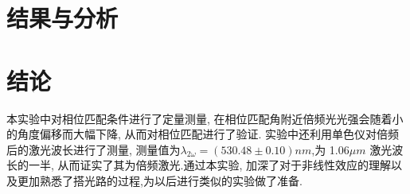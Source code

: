 \documentclass[aps,pre,12pt,preprint,%
	onecolumn,showpacs,showkeys,nofootinbib]{revtex4-2}
\begin{document}
\section{结果与分析}
%	
%	

\section{结论}
本实验中对相位匹配条件进行了定量测量, 在相位匹配角附近倍频光光强会随着小的角度偏移而大幅下降, 从而对相位匹配进行了验证. 实验中还利用单色仪对倍频后的激光波长进行了测量, 测量值为$\lambda_{2\omega} =(530.48 \pm 0.10)nm$,为 1.06$\mu m$ 激光波长的一半, 从而证实了其为倍频激光.通过本实验, 加深了对于非线性效应的理解以及更加熟悉了搭光路的过程,为以后进行类似的实验做了准备.
\end{document}
